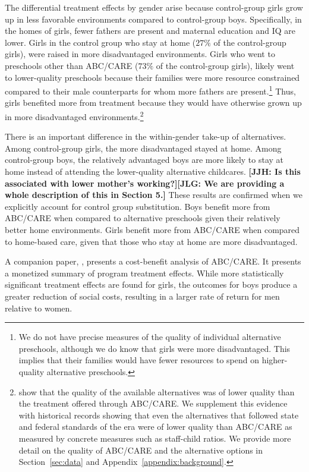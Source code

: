The differential treatment effects by gender arise because control-group girls grow up in less favorable environments compared to control-group boys. Specifically, in the homes of girls, fewer fathers are present and maternal education and IQ are lower. Girls in the control group who stay at home ($27\%$ of the control-group girls), were raised in more disadvantaged environments. Girls who went to preschools other than ABC/CARE ($73\%$ of the control-group girls), likely went to lower-quality preschools because their families were more resource constrained compared to their male counterparts for whom more fathers are present.\footnote{We do not have precise measures of the quality of individual alternative preschools, although we do know that girls were more disadvantaged. This implies that their families would have fewer resources to spend on higher-quality alternative preschools.} Thus, girls benefited more from treatment because they would have otherwise grown up in more disadvantaged environments.\footnote{\citet{Burchinal_etal_1989_CD_Daycare-Pre-K-Dev} show that the quality of the available alternatives was of lower quality than the treatment offered through ABC/CARE. We supplement this evidence with historical records showing that even the alternatives that followed state and federal standards of the era were of lower quality than ABC/CARE as measured by concrete measures such as staff-child ratios. We provide more detail on the quality of ABC/CARE and the alternative options in Section~\ref{sec:data} and Appendix~\ref{appendix:background}.}

There is an important difference in the within-gender take-up of alternatives. Among control-group girls, the more disadvantaged stayed at home. Among control-group boys, the relatively advantaged boys are more likely to stay at home instead of attending the lower-quality alternative childcares. \textbf{[JJH: Is this associated with lower mother's working?][JLG: We are providing a whole description of this in Section 5.]} These results are confirmed when we explicitly account for control group substitution. Boys benefit more from ABC/CARE when compared to alternative preschools given their relatively better home environments. Girls benefit more from ABC/CARE when compared to home-based care, given that those who stay at home are more disadvantaged.


A companion paper, \citet{Garcia_Heckman_Leaf_etal_2017_Comp_CBA_Unpublished}, presents a cost-benefit analysis of ABC/CARE. It presents a monetized summary of program treatment effects. While more statistically significant treatment effects are found for girls, the outcomes for boys produce a greater reduction of social costs, resulting in a larger rate of return for men relative to women.

